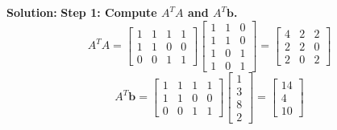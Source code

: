 \documentclass[11pt, letterpaper]{article}
\theoremstyle{definition}
\theoremstyle{remark}
\begin{document}
\textbf{Solution:}
\textbf{Step 1: Compute $A^T A$ and $A^T \mathbf{b}$.}
\[
A^T A = \begin{bmatrix} 1 & 1 & 1 & 1 \\ 1 & 1 & 0 & 0 \\ 0 & 0 & 1 & 1 \end{bmatrix} \begin{bmatrix} 1 & 1 & 0 \\ 1 & 1 & 0 \\ 1 & 0 & 1 \\ 1 & 0 & 1 \end{bmatrix} = \begin{bmatrix} 4 & 2 & 2 \\ 2 & 2 & 0 \\ 2 & 0 & 2 \end{bmatrix}
\]
\[
A^T \mathbf{b} = \begin{bmatrix} 1 & 1 & 1 & 1 \\ 1 & 1 & 0 & 0 \\ 0 & 0 & 1 & 1 \end{bmatrix} \begin{bmatrix} 1 \\ 3 \\ 8 \\ 2 \end{bmatrix} = \begin{bmatrix} 14 \\ 4 \\ 10 \end{bmatrix}
\]
\end{document}
